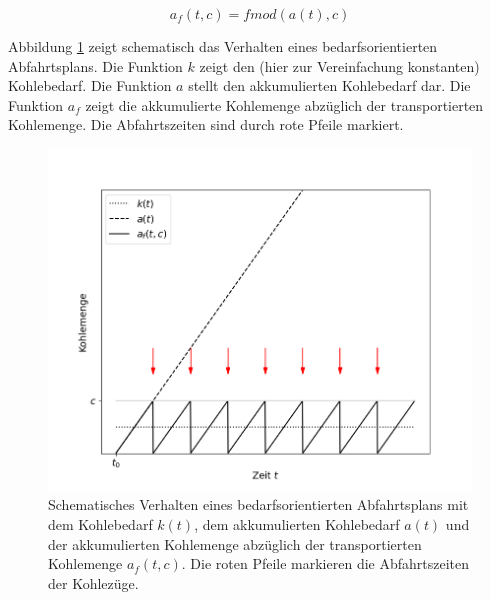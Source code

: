 \begin{equation}
    a_f(t, c)=fmod(a(t), c)\label{eq:kohle-fmod}
\end{equation}

Abbildung \ref{fig:demand-math} zeigt schematisch das Verhalten eines bedarfsorientierten Abfahrtsplans. Die Funktion $k$ zeigt den (hier zur Vereinfachung konstanten) Kohlebedarf. Die Funktion $a$ stellt den akkumulierten Kohlebedarf dar. Die Funktion $a_f$ zeigt die akkumulierte Kohlemenge abzüglich der transportierten Kohlemenge. Die Abfahrtszeiten sind durch rote Pfeile markiert.

\begin{figure}[H]
	\centering
	\includegraphics[width=1.0\linewidth]{images/demand-math.png}
	\caption{Schematisches Verhalten eines bedarfsorientierten Abfahrtsplans mit dem Kohlebedarf $k(t)$, dem akkumulierten Kohlebedarf $a(t)$ und der akkumulierten Kohlemenge abzüglich der transportierten Kohlemenge $a_f(t,c)$. Die roten Pfeile markieren die Abfahrtszeiten der Kohlezüge.}
	\label{fig:demand-math}
\end{figure}